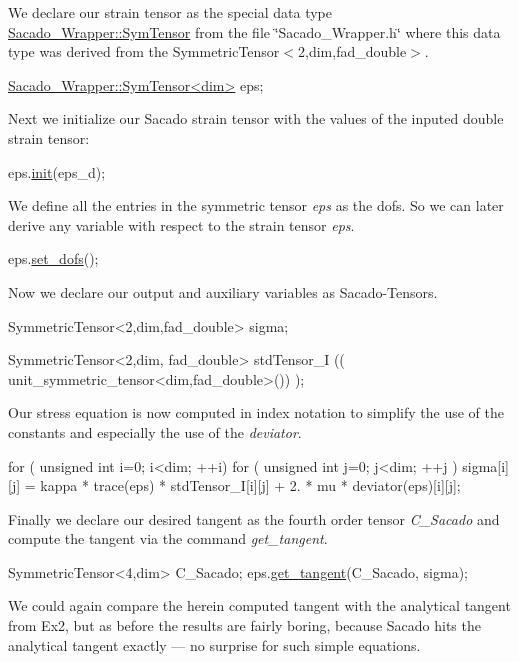 We declare our strain tensor as the special data type \hyperlink{classSacado__Wrapper_1_1SymTensor}{Sacado\+\_\+\+Wrapper\+::\+Sym\+Tensor} from the file \char`\"{}\+Sacado\+\_\+\+Wrapper.\+h\char`\"{} where this data type was derived from the Symmetric\+Tensor$<$2,dim,fad\+\_\+double$>$. 
\begin{DoxyCode}
\hyperlink{classSacado__Wrapper_1_1SymTensor}{Sacado\_Wrapper::SymTensor<dim>} eps;
\end{DoxyCode}
 Next we initialize our Sacado strain tensor with the values of the inputed double strain tensor\+: 
\begin{DoxyCode}
eps.\hyperlink{classSacado__Wrapper_1_1SymTensor_acbad579d5ead9e96ff46aa15d9b5aef4}{init}(eps\_d);
\end{DoxyCode}
 We define all the entries in the symmetric tensor {\itshape eps} as the dofs. So we can later derive any variable with respect to the strain tensor {\itshape eps}. 
\begin{DoxyCode}
eps.\hyperlink{classSacado__Wrapper_1_1SymTensor_aa9e0fcc9d4e0a4120bedb8ef9b8d7ecb}{set\_dofs}();
\end{DoxyCode}
 Now we declare our output and auxiliary variables as Sacado-\/\+Tensors. 
\begin{DoxyCode}
SymmetricTensor<2,dim,fad\_double> sigma;

SymmetricTensor<2,dim, fad\_double> stdTensor\_I (( unit\_symmetric\_tensor<dim,fad\_double>()) );
\end{DoxyCode}
 Our stress equation is now computed in index notation to simplify the use of the constants and especially the use of the {\itshape deviator}. 
\begin{DoxyCode}
\textcolor{keywordflow}{for} ( \textcolor{keywordtype}{unsigned} \textcolor{keywordtype}{int} i=0; i<dim; ++i)
  \textcolor{keywordflow}{for} ( \textcolor{keywordtype}{unsigned} \textcolor{keywordtype}{int} j=0; j<dim; ++j )
      sigma[i][j] = kappa * trace(eps) *  stdTensor\_I[i][j] + 2. * mu * deviator(eps)[i][j];
\end{DoxyCode}
 Finally we declare our desired tangent as the fourth order tensor {\itshape C\+\_\+\+Sacado} and compute the tangent via the command {\itshape get\+\_\+tangent}. 
\begin{DoxyCode}
SymmetricTensor<4,dim> C\_Sacado;
eps.\hyperlink{classSacado__Wrapper_1_1SymTensor_ab97427c3b5cab279e58607cf431ab262}{get\_tangent}(C\_Sacado, sigma);
\end{DoxyCode}
 We could again compare the herein computed tangent with the analytical tangent from Ex2, but as before the results are fairly boring, because Sacado hits the analytical tangent exactly --- no surprise for such simple equations.

